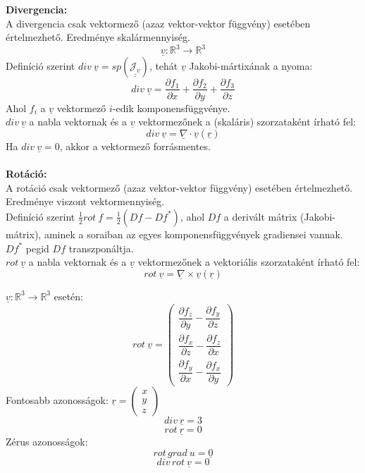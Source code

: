 \documentclass[11pt,a4paper]{article}
\begin{document}
\begin{tcolorbox}[colback=red!5!white,colframe=red!60!black,title= 4. Gradiens{,} divergencia{,} rotáció I.]
    \textbf{Divergencia:} \\
    A divergencia csak vektormező (azaz vektor-vektor függvény) esetében értelmezhető. Eredménye skalármennyiség.
    $$\underline{v}: \mathbb{R}^3 \rightarrow \mathbb{R}^3 $$
    Definíció szerint $div\ \underline{v} = sp(\underline{\underline{\mathcal{J}_v}})$, tehát $\underline{v}$ Jakobi-mártixának a nyoma:
    $$div\ \underline{v} = \frac{\partial f_1}{\partial x} + \frac{\partial f_2}{\partial y} + \frac{\partial f_3}{\partial z}$$
    Ahol $f_i$ a $\underline{v}$ vektormező $i$-edik komponensfüggvénye. \\
    $div\ \underline{v}$ a nabla vektornak és a $\underline{v}$ vektormezőnek a (skaláris) szorzataként írható fel:
    $$div\ \underline{v} = \underline{\nabla} \cdot \underline{v}(\underline{r})$$
    Ha $div\ \underline{v} = 0$, akkor a vektormező forrásmentes.
\\\\
    \textbf{Rotáció:} \\
    A rotáció csak vektormező (azaz vektor-vektor függvény) esetében értelmezhető. Eredménye viszont vektormennyiség. \\
    Definíció szerint $\frac{1}{2}rot\ f = \frac{1}{2}(Df-Df^*)$, ahol $Df$ a derivált mátrix (Jakobi-mátrix), aminek a soraiban az egyes komponensfüggvények gradiensei vannak. $Df^*$ pegid $Df$ transzponáltja. \\
    $rot\ \underline{v}$ a nabla vektornak és a $\underline{v}$ vektormezőnek a vektoriális szorzataként írható fel:
    $$rot\ \underline{v} = \underline{\nabla} \times \underline{v}(\underline{r})$$
    \end{tcolorbox}

    \begin{tcolorbox}[colback=red!5!white,colframe=red!60!black,title= 4. Gradiens{,} divergencia{,} rotáció II.] %
    $\underline{v}: \mathbb{R}^3 \rightarrow \mathbb{R}^3$ esetén:
    $$rot\ \underline{v} = 
    \begin{pmatrix}
        \dfrac{\partial f_z}{\partial y} - \dfrac{\partial f_y}{\partial z}\\[8pt]
        \dfrac{\partial f_x}{\partial z} - \dfrac{\partial f_z}{\partial x}\\[8pt]
        \dfrac{\partial f_y}{\partial x} - \dfrac{\partial f_x}{\partial y}
    \end{pmatrix}$$
    Fontosabb azonosságok: $\underline{r} = \begin{pmatrix} x\\ y\\ z \end{pmatrix}$
    $$div\ \underline{r} = 3$$
    $$rot\ \underline{r} = 0$$
    Zérus azonosságok:
    $$rot\,grad\ u = \underline{0}$$
    $$div\,rot\ \underline{v} = 0$$
    \end{tcolorbox}
\end{document}

